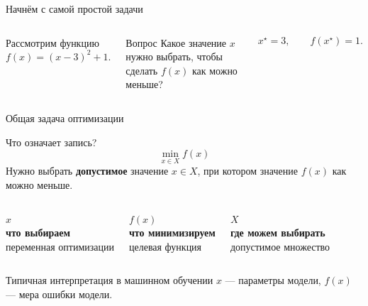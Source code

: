 \documentclass[aspectratio=169,10pt]{beamer}
\begin{document}
\begin{frame}{Начнём с самой простой задачи}
\begin{columns}[T,onlytextwidth]
\vspace{1em}
Рассмотрим функцию
\[
  f(x)=(x-3)^2+1.
\]

\begin{block}{Вопрос}
Какое значение $x$ нужно выбрать, чтобы сделать $f(x)$ как можно меньше?
\end{block}

\pause
\[
  x^\star=3, \qquad f(x^\star)=1.
\]

\end{columns}
\end{frame}

\begin{frame}{Общая задача оптимизации}
\vspace{0.25em}

\begin{block}{Что означает запись?}
\centering
\[
\boxed{\displaystyle \min_{x\in X} f(x)}
\]
Нужно выбрать \textbf{допустимое} значение $x\in X$, при котором значение $f(x)$ как можно меньше.
\end{block}

\vspace{0.55em}
\begin{columns}[T,onlytextwidth]
\centering
{\Large\color{HSEblue}$x$}\\[0.2em]
\textbf{что выбираем}\\[-0.1em]
\small переменная оптимизации

\centering
{\Large\color{HSEblue}$f(x)$}\\[0.2em]
\textbf{что минимизируем}\\[-0.1em]
\small целевая функция

\centering
{\Large\color{HSEblue}$X$}\\[0.2em]
\textbf{где можем выбирать}\\[-0.1em]
\small допустимое множество
\end{columns}

\vspace{0.9em}
\begin{alertblock}{Типичная интерпретация в машинном обучении}
\centering
$x$ --- параметры модели, \qquad $f(x)$ --- мера ошибки модели.
\end{alertblock}
\end{frame}
\end{document}
